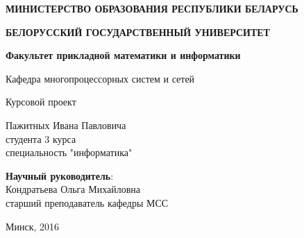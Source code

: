 \begin{titlepage}
    \begin{center}
         \textbf{МИНИСТЕРСТВО ОБРАЗОВАНИЯ РЕСПУБЛИКИ БЕЛАРУСЬ}
    \end{center}
    \begin{center}
         \textbf{БЕЛОРУССКИЙ ГОСУДАРСТВЕННЫЙ УНИВЕРСИТЕТ}
    \end{center}
    \begin{center}
         \textbf{Факультет прикладной математики и информатики}
    \end{center}
    \begin{center}
        Кафедра многопроцессорных систем и сетей
    \end{center}
    
    \vspace{9em}
    
    \begin{center}
        \textbf{\@jobtitle}
    \end{center}
    
    \vspace{2em}
    
    \begin{center}
        Курсовой проект
    \end{center}
    
    \vspace{4em}
    
    \begin{flushright}
        Пажитных Ивана Павловича\\
        студента 3 курса\\
        специальность "информатика"\\
    \end{flushright}
    
    \vspace{1em}
    
    \begin{flushright}
         \textbf{Научный руководитель}:\\
        Кондратьева Ольга Михайловна\\
        старший преподаватель кафедры МСС\\
    \end{flushright}
    
    \vfill
    
    \begin{center}
        Минск, 2016
    \end{center}
\end{titlepage}
\newpage
